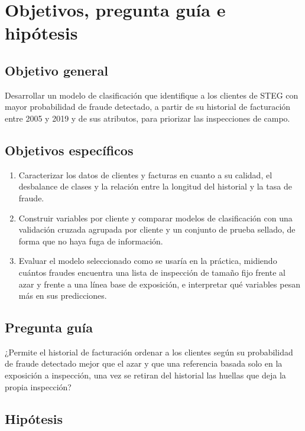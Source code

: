 \section{Objetivos, pregunta guía e hipótesis}\label{sec:objetivos}

\subsection{Objetivo general}

Desarrollar un modelo de clasificación que identifique a los clientes de STEG con mayor
probabilidad de fraude detectado, a partir de su historial de facturación entre 2005 y 2019
y de sus atributos, para priorizar las inspecciones de campo.

\subsection{Objetivos específicos}

\begin{enumerate}
  \item Caracterizar los datos de clientes y facturas en cuanto a su calidad, el desbalance
    de clases y la relación entre la longitud del historial y la tasa de fraude.
  \item Construir variables por cliente y comparar modelos de clasificación con una
    validación cruzada agrupada por cliente y un conjunto de prueba sellado, de forma que no
    haya fuga de información.
  \item Evaluar el modelo seleccionado como se usaría en la práctica, midiendo cuántos
    fraudes encuentra una lista de inspección de tamaño fijo frente al azar y frente a una
    línea base de exposición, e interpretar qué variables pesan más en sus predicciones.
\end{enumerate}

\subsection{Pregunta guía}

¿Permite el historial de facturación ordenar a los clientes según su probabilidad de fraude
detectado mejor que el azar y que una referencia basada solo en la exposición a inspección,
una vez se retiran del historial las huellas que deja la propia inspección?

\subsection{Hipótesis}

